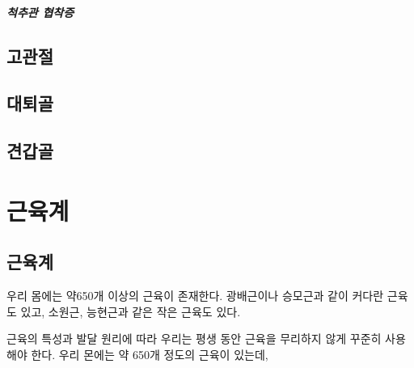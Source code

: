 \documentclass[12pt, a4paper, oneside]{book}
\let\stdsection\section
\renewcommand\section{\newpage\stdsection}
\begin{document}
\paragraph{척추관 협착증}


	\section{고관절}

	\section{대퇴골}


	\section{견갑골}



		\chapter{근육계}
		\minitoc%



		\section{근육계}

우리 몸에는 약650개 이상의 근육이 존재한다.
광배근이나 승모근과 같이 커다란 근육도 있고, 소원근, 능현근과 같은 작은 근육도 있다.

근육의 특성과 발달 원리에 따라 우리는 평생 동안 근육을 무리하지 않게 꾸준히 사용해야 한다.
우리 몬에는 약 650개 정도의 근육이 있는데,
\end{document}
